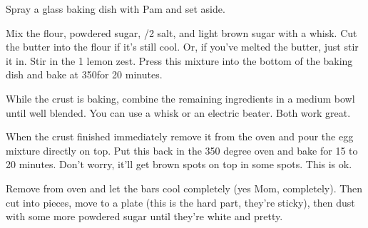 \begin{IngredientsAndSteps}
    {}

    {}

    \ListIngredientsAndSteps[Assembly]
    {
    }
    {
        Spray a  glass baking dish with Pam and set aside.

        Mix the flour, powdered sugar, /2 \tsp salt, and light brown sugar
        with a whisk. Cut the butter into the flour if it's still cool. Or, if you've melted
        the butter, just stir it in. Stir in the 1 \Tbl lemon zest. Press this mixture
        into the bottom of the baking dish and bake at 350\Degrees[F] for 20 minutes.

        While the crust is baking, combine the remaining ingredients in a medium bowl until
        well blended. You can use a whisk or an electric beater. Both work great.

        When the crust finished immediately remove it from the oven and pour the egg mixture
        directly on top. Put this back in the 350 degree oven and bake for 15 to 20 minutes. Don't
        worry, it'll get brown spots on top in some spots. This is ok.

        Remove from oven and let the bars cool completely (yes Mom, completely). Then cut into
         pieces, move to a plate (this is the hard part, they're sticky), then dust
        with some more powdered sugar until they're white and pretty.
    }
\end{IngredientsAndSteps}

%
%
%
%
\newpage


